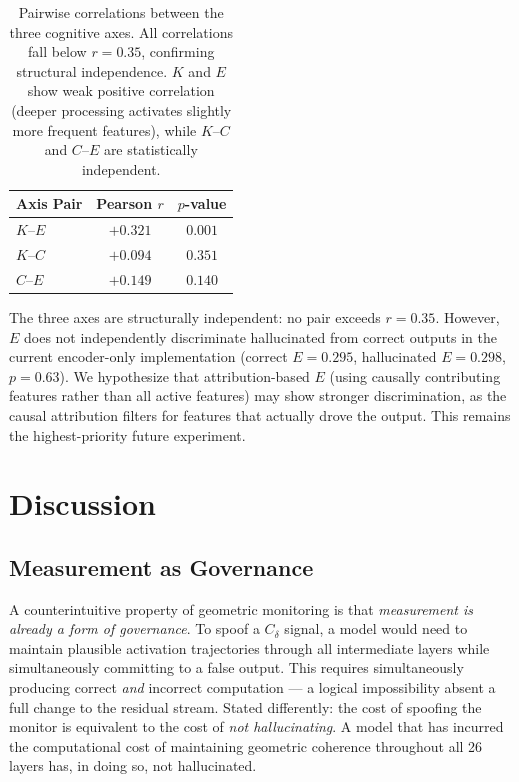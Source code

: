 \documentclass{article}
\begin{document}
\begin{table}[h]
\centering
\begin{tabular}{lcc}
\toprule
Axis Pair & Pearson $r$ & $p$-value \\
\midrule
$K$--$E$ & $+0.321$ & $0.001$ \\
$K$--$C$ & $+0.094$ & $0.351$ \\
$C$--$E$ & $+0.149$ & $0.140$ \\
\bottomrule
\end{tabular}
\caption{Pairwise correlations between the three cognitive axes. All correlations fall below $r = 0.35$, confirming structural independence. $K$ and $E$ show weak positive correlation (deeper processing activates slightly more frequent features), while $K$--$C$ and $C$--$E$ are statistically independent.}
\end{table}

The three axes are structurally independent: no pair exceeds $r = 0.35$. However, $E$ does not independently discriminate hallucinated from correct outputs in the current encoder-only implementation (correct $E = 0.295$, hallucinated $E = 0.298$, $p = 0.63$). We hypothesize that attribution-based $E$ (using causally contributing features rather than all active features) may show stronger discrimination, as the causal attribution filters for features that actually drove the output. This remains the highest-priority future experiment.

\section{Discussion}

\subsection{Measurement as Governance}

A counterintuitive property of geometric monitoring is that \emph{measurement is already a form of governance}. To spoof a $C_\delta$ signal, a model would need to maintain plausible activation trajectories through all intermediate layers while simultaneously committing to a false output. This requires simultaneously producing correct \emph{and} incorrect computation --- a logical impossibility absent a full change to the residual stream. Stated differently: the cost of spoofing the monitor is equivalent to the cost of \emph{not hallucinating}. A model that has incurred the computational cost of maintaining geometric coherence throughout all 26 layers has, in doing so, not hallucinated.
\end{document}
